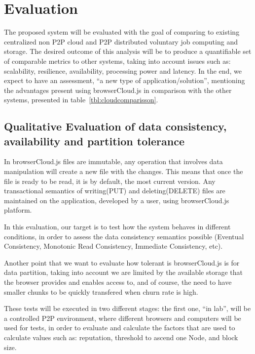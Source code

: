 
% 
% 

\section{Evaluation}

The proposed system will be evaluated with the goal of comparing to existing centralized non P2P cloud and P2P distributed voluntary job computing and storage. The desired outcome of this analysis will be to produce a quantifiable set of comparable metrics to other systems, taking into account issues such as: scalability, resilience, availability, processing power and latency. In the end, we expect to have an assessment, ``a new type of application/solution'', mentioning the advantages present using browserCloud.js in comparison with the other systems, presented in table~\ref{tbl:cloudcomparisson}.


\subsection{Qualitative Evaluation of data consistency, availability and partition tolerance}

In browserCloud.js files are immutable, any operation that involves data manipulation will create a new file with the changes. This means that once the file is ready to be read, it is by default, the most current version. Any transactional semantics of writing(PUT) and deleting(DELETE) files are maintained on the application, developed by a user, using browserCloud.js platform. 

In this evaluation, our target is to test how the system behaves in different conditions, in order to assess the data consistency semantics possible (Eventual Consistency, Monotonic Read Consistency, Immediate Consistency, etc).

Another point that we want to evaluate how tolerant is browserCloud.js is for data partition, taking into account we are limited by the available storage that the browser provides and enables access to, and of course, the need to have smaller chunks to be quickly transfered when churn rate is high.

These tests will be executed in two different stages: the first one, ``in lab'', will be a controlled P2P environment, where different browsers and computers will be used for tests, in order to evaluate and calculate the factors that are used to calculate values such as: reputation, threshold to ascend one Node, and block size. 

